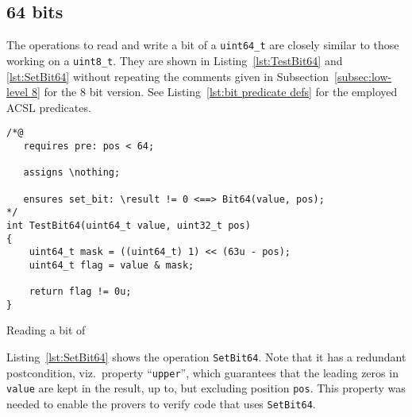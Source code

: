 \FloatBarrier

\subsection{64 bits}
\label{subsec:low-level 64}



The operations to read and write a bit of a \lstinline{uint64_t}
are closely similar to
those working on a \lstinline{uint8_t}.
%
They are shown in Listing~\ref{lst:TestBit64}
and \ref{lst:SetBit64} without repeating the comments given
in Subsection~\ref{subsec:low-level 8} for the 8 bit version.
%
See Listing~\ref{lst:bit predicate defs} for the employed ACSL predicates.





\begin{listing}[hbt]
\begin{minipage}{0.99\textwidth}
\begin{lstlisting}[style=acsl-block]
/*@
   requires pre: pos < 64;

   assigns \nothing;

   ensures set_bit: \result != 0 <==> Bit64(value, pos);
*/
int TestBit64(uint64_t value, uint32_t pos)
{
    uint64_t mask = ((uint64_t) 1) << (63u - pos);
    uint64_t flag = value & mask;

    return flag != 0u;
}
\end{lstlisting}
\end{minipage}
\caption{\label{lst:TestBit64}Reading a bit of }
\end{listing}








Listing~\ref{lst:SetBit64} shows the operation \lstinline{SetBit64}.
%
Note that it has a redundant postcondition, viz.\ property
``\lstinline{upper}'', which guarantees that the leading zeros in
\lstinline{value} are kept in the result, up to, but excluding
position \lstinline{pos}.
%
This property was needed to enable the provers to verify code that uses
\lstinline{SetBit64}.




